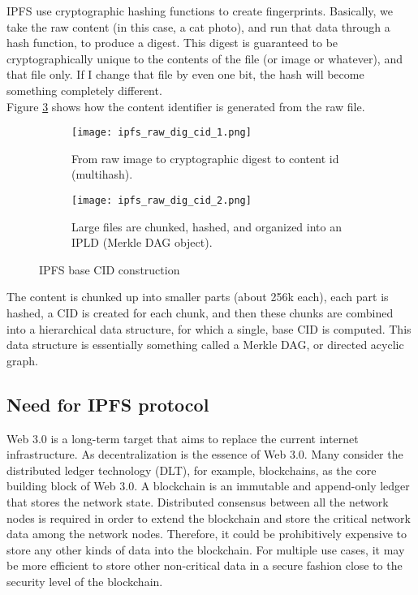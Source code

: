 IPFS use cryptographic hashing functions to create fingerprints. Basically, we take the raw content (in this case, a cat photo), and run that data through a hash function, to produce a digest. This digest is guaranteed to be cryptographically unique to the contents of the file (or image or whatever), and that file only. If I change that file by even one bit, the hash will become something completely different. \\[-8pt]

Figure \ref{img:ipfsAlgorithmVis} shows how the content identifier is generated from the raw file.

\begin{figure}
  \centering
  \begin{subfigure}[!hbtp]{0.45\textwidth}
    \centering
    \texttt{[image: ipfs\_raw\_dig\_cid\_1.png]}
    \caption{From raw image to cryptographic digest to content id (multihash).}
    \label{img:ipfsalgorithmvis1}
  \end{subfigure}
  \hfill
  \begin{subfigure}[!hbtp]{0.45\textwidth}
    \centering
    \texttt{[image: ipfs\_raw\_dig\_cid\_2.png]}
    \caption{Large files are chunked, hashed, and organized into an IPLD (Merkle DAG object).}
    \label{img:ipfsalgorithmvis2}
  \end{subfigure}
  \caption{IPFS base CID construction}
  \label{img:ipfsAlgorithmVis}
\end{figure}

The content is chunked up into smaller parts (about 256k each), each part is hashed, a CID is created for each chunk, and then these chunks are combined into a hierarchical data structure, for which a single, base CID is computed.
This data structure is essentially something called a Merkle DAG, or directed acyclic graph. \\[-8pt]

\subsection{Need for IPFS protocol}

Web 3.0 is a long-term target that aims to replace the current internet infrastructure. As decentralization is the essence of Web 3.0. Many consider the distributed ledger technology (DLT), for example, blockchains, as the core building block of Web 3.0. A blockchain is an immutable and append-only ledger that stores the network state. Distributed consensus between all the network nodes is required in order to extend the blockchain and store the critical network data among the network nodes. Therefore, it could be prohibitively expensive to store any other kinds of data into the blockchain. For multiple use cases, it may be more efficient to store other non-critical data in a secure fashion close to the security level of the blockchain. \\[-8pt]

